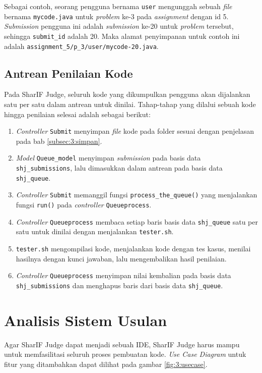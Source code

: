Sebagai contoh, seorang pengguna bernama \verb|user| mengunggah sebuah \textit{file} bernama \verb|mycode.java| untuk \textit{problem} ke-3 pada \textit{assignment} dengan id 5. \textit{Submission} pengguna ini adalah \textit{submission} ke-20 untuk \textit{problem} tersebut, sehingga \verb|submit_id| adalah 20. Maka alamat penyimpanan untuk contoh ini adalah \verb|assignment_5/p_3/user/mycode-20.java|.


\subsection{Antrean Penilaian Kode}
\label{subsec:3:antrean} 
Pada SharIF Judge, seluruh kode yang dikumpulkan pengguna akan dijalankan satu per satu dalam antrean untuk dinilai. Tahap-tahap yang dilalui sebuah kode hingga penilaian selesai adalah sebagai berikut:

\begin{enumerate}
    \item \textit{Controller} \verb|Submit| menyimpan \textit{file} kode pada folder sesuai dengan penjelasan pada bab \ref{subsec:3:simpan}.
    \item \textit{Model} \verb|Queue_model| menyimpan \textit{submission} pada basis data \verb|shj_submissions|, lalu dimasukkan dalam antrean pada basis data \verb|shj_queue|.
    \item \textit{Controller} \verb|Submit| memanggil fungsi \verb|process_the_queue()| yang menjalankan fungsi \verb|run()| pada \textit{controller} \verb|Queueprocess|.
    \item \textit{Controller} \verb|Queueprocess| membaca setiap baris basis data \verb|shj_queue| satu per satu untuk dinilai dengan menjalankan \verb|tester.sh|.
    \item \verb|tester.sh| mengompilasi kode, menjalankan kode dengan tes kasus, menilai hasilnya dengan kunci jawaban, lalu mengembalikan hasil penilaian.
    \item \textit{Controller} \verb|Queueprocess| menyimpan nilai kembalian pada basis data \verb|shj_submissions| dan menghapus baris dari basis data \verb|shj_queue|.
\end{enumerate}

\section{Analisis Sistem Usulan}
\label{sec:3:analisisusulan} 
Agar SharIF Judge dapat menjadi sebuah IDE, SharIF Judge harus mampu untuk memfasilitasi seluruh proses pembuatan kode. \textit{Use Case Diagram} untuk fitur yang ditambahkan dapat dilihat pada gambar \ref{fig:3:usecase}.
   
